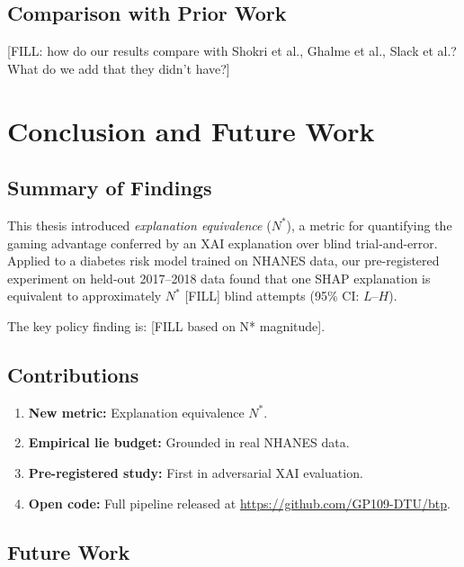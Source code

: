 \documentclass[12pt, a4paper, oneside]{report}
\theoremstyle{definition}
\begin{document}
\section{Comparison with Prior Work}

[FILL: how do our results compare with Shokri et al., Ghalme et al., Slack et al.?
 What do we add that they didn't have?]

\chapter{Conclusion and Future Work}
\label{chap:conclusion}

\section{Summary of Findings}

This thesis introduced \textit{explanation equivalence} ($N^*$), a metric
for quantifying the gaming advantage conferred by an XAI explanation over
blind trial-and-error. Applied to a diabetes risk model trained on NHANES
data, our pre-registered experiment on held-out 2017--2018 data found that
one SHAP explanation is equivalent to approximately $N^*$ [FILL] blind
attempts (95\% CI: $L$--$H$).

The key policy finding is: [FILL based on N* magnitude].

\section{Contributions}

\begin{enumerate}
  \item \textbf{New metric:} Explanation equivalence $N^*$.
  \item \textbf{Empirical lie budget:} Grounded in real NHANES data.
  \item \textbf{Pre-registered study:} First in adversarial XAI evaluation.
  \item \textbf{Open code:} Full pipeline released at \url{https://github.com/GP109-DTU/btp}.
\end{enumerate}

\section{Future Work}
\end{document}
